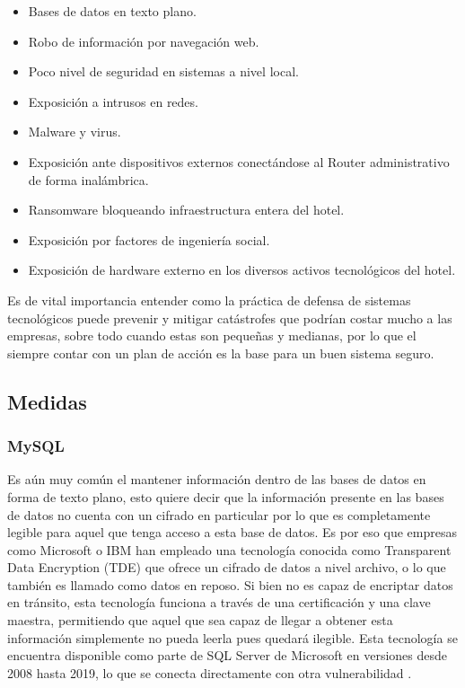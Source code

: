 \documentclass[10pt]{article}
\begin{document}
\begin{itemize}
    \item Bases de datos en texto plano.
    \item Robo de información por navegación web.
    \item Poco nivel de seguridad en sistemas a nivel local.
    \item Exposición a intrusos en redes. 
    \item Malware y virus.
    \item Exposición ante dispositivos externos conectándose al Router administrativo de forma inalámbrica.
    \item Ransomware bloqueando infraestructura entera del hotel.
    \item Exposición por factores de ingeniería social.
    \item Exposición de hardware externo en los diversos activos tecnológicos del hotel.
\end{itemize}

Es de vital importancia entender como la práctica de defensa de sistemas tecnológicos puede prevenir y mitigar catástrofes que podrían costar mucho a las empresas, sobre todo cuando estas son pequeñas y medianas, por lo que el siempre contar con un plan de acción es la base para un buen sistema seguro.

\subsection{Medidas}

\subsubsection{MySQL}

Es aún muy común el mantener información dentro de las bases de datos en forma de texto plano, esto quiere decir que la información presente en las  bases de datos no cuenta con un cifrado en particular por lo que es completamente legible para aquel que tenga acceso a esta base de datos. Es por eso que empresas como Microsoft o IBM han empleado una tecnología conocida como Transparent Data Encryption (TDE) que ofrece un cifrado de datos a nivel archivo, o lo que también es llamado como datos en reposo. Si bien no es capaz de encriptar datos en tránsito, esta tecnología funciona a través de una certificación y una clave maestra, permitiendo que aquel que sea capaz de llegar a obtener esta información simplemente no pueda leerla pues quedará ilegible. Esta tecnología se encuentra disponible como parte de SQL Server de Microsoft en versiones desde 2008 hasta 2019, lo que se conecta directamente con otra vulnerabilidad \cite{ref9}.
\end{document}
